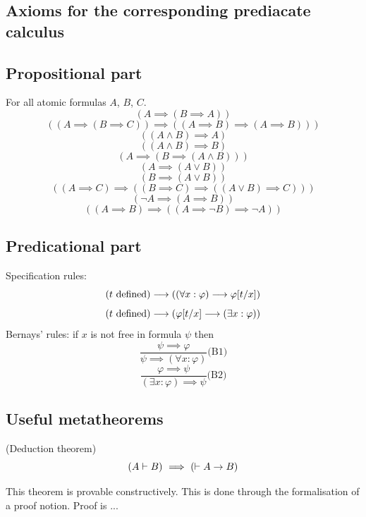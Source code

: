 
\subsection{Axioms for the corresponding prediacate calculus}
\subsection{Propositional part}
For all atomic formulas $A$, $B$, $C$.
\[
(A \implies (B \implies A))
\]
\[
((A \implies (B \implies C))\implies ((A \implies B) \implies (A \implies B)))
\]
\[
((A\land B) \implies A)
\]
\[
((A\land B) \implies B)
\]
\[
(A \implies (B\implies (A\land B)))
\]
\[
(A \implies (A\lor B))
\]
\[
(B \implies (A\lor B))
\]
\[
((A \implies C)\implies ((B \implies C) \implies ((A\lor B)\implies C)))
\]
\[
(\neg A \implies (A\implies B))
\]
\[
((A\implies B)\implies ((A \implies \neg B) \implies \neg A) )
\]
\subsection{Predicational part}
Specification rules:
\[
(t\mathrm{\ defined})\longrightarrow ((\forall x: \varphi) \longrightarrow \varphi[t/x])
\]
\[
(t\mathrm{\ defined}) \longrightarrow (\varphi[t/x] \longrightarrow (\exists x: \varphi))
\]
Bernays' rules: if $x$ is not free in formula $\psi$ then
\[
\frac{
\psi \implies \varphi
}{
\psi \implies (\forall x:\varphi)
}\mbox{(B1)}
\]
\[
\frac{
\varphi \implies \psi
}{
(\exists x:\varphi)\implies \psi
}\mbox{(B2)}
\]



\subsection{Useful metatheorems}

\begin{theorem}(Deduction theorem)
\[
(A \vdash B)
\ \Longrightarrow\ 
(\vdash A\to B)
\]
\end{theorem}
\Proof
This theorem is provable constructively.
This is done through the formalisation of a proof notion.
Proof is ...
\Done

